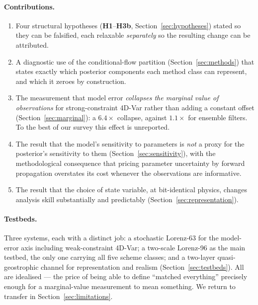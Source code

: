 \paragraph{Contributions.}
\begin{enumerate}[leftmargin=2em]
  \item Four structural hypotheses (\textbf{H1}--\textbf{H3b},
    Section~\ref{sec:hypotheses}) stated so they can be falsified, each relaxable
    \emph{separately} so the resulting change can be attributed.
  \item A diagnostic use of the conditional-flow partition
    (Section~\ref{sec:methods}) that states exactly which posterior components
    each method class can represent, and which it zeroes by construction.
  \item The measurement that model error \emph{collapses the marginal value of
    observations} for strong-constraint 4D-Var rather than adding a constant
    offset (Section~\ref{sec:marginal}): a $6.4\times$ collapse, against
    $1.1\times$ for ensemble filters. To the best of our survey this effect is
    unreported.
  \item The result that the model's sensitivity to parameters is \emph{not} a
    proxy for the posterior's sensitivity to them
    (Section~\ref{sec:sensitivity}), with the methodological consequence that
    pricing parameter uncertainty by forward propagation overstates its cost
    whenever the observations are informative.
  \item The result that the choice of state variable, at bit-identical physics,
    changes analysis skill substantially and predictably
    (Section~\ref{sec:representation}).
\end{enumerate}

\paragraph{Testbeds.}
Three systems, each with a distinct job: a stochastic Lorenz-63 for the
model-error axis including weak-constraint 4D-Var; a two-scale Lorenz-96 as the
main testbed, the only one carrying all five scheme classes; and a two-layer
quasi-geostrophic channel for representation and realism
(Section~\ref{sec:testbeds}). All are idealised --- the price of being able to
define ``matched everything'' precisely enough for a marginal-value measurement
to mean something. We return to transfer in Section~\ref{sec:limitations}.
